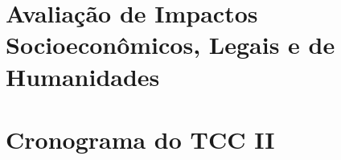 \documentclass[
    12pt,
    openright,
    twoside,
    a4paper,
    chapter=TITLE,
    section=TITLE,
    english,
    brazil
    ]{abntex2}
\begin{document}
\chapter{Avaliação de Impactos Socioeconômicos, Legais e de Humanidades}

\chapter{Cronograma do TCC II}

\postextual


\end{document}
